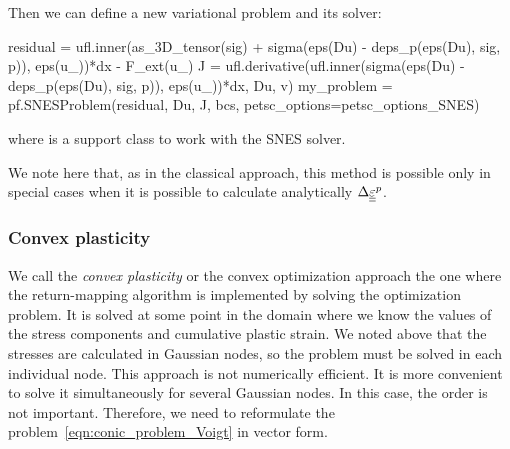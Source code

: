 \documentclass[12pt]{article}
\begin{document}
Then we can define a new variational problem and its solver:
\begin{pythoncode}
    residual = ufl.inner(as_3D_tensor(sig) + sigma(eps(Du) - deps_p(eps(Du), sig, p)), eps(u_))*dx - F_ext(u_)
    J = ufl.derivative(ufl.inner(sigma(eps(Du) - deps_p(eps(Du), sig, p)), eps(u_))*dx, Du, v)
    my_problem = pf.SNESProblem(residual, Du, J, bcs, petsc_options=petsc_options_SNES)
\end{pythoncode}
where  is a support class to work with the SNES solver.

We note here that, as in the classical approach, this method is possible only in special cases when it is possible to calculate analytically $\Delta\underline{\underline{\varepsilon}}^p$.

\subsubsection{Convex plasticity}
\label{sec:development:convex_plasticity}

We call the \textit{convex plasticity} or the convex optimization approach the one where the return-mapping algorithm is implemented by solving the optimization problem. It is solved at some point in the domain where we know the values of the stress components and cumulative plastic strain. We noted above that the stresses are calculated in Gaussian nodes, so the problem must be solved in each individual node. This approach is not numerically efficient. It is more convenient to solve it simultaneously for several Gaussian nodes. In this case, the order is not important. Therefore, we need to reformulate the problem~\eqref{eqn:conic_problem_Voigt} in vector form. 
\end{document}
